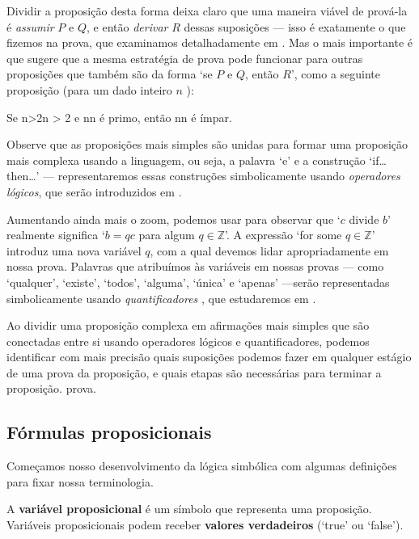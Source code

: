 Dividir a proposição desta forma deixa claro que uma maneira viável de prová-la é \textit{assumir} $P$ e $Q$, e então \textit{derivar} $R$ dessas suposições --- isso é exatamente o que fizemos na prova, que examinamos detalhadamente em . Mas o mais importante é que sugere que a mesma estratégia de prova pode funcionar para outras proposições que também são da forma `se $P$ e $Q$, então $R$', como a seguinte proposição (para um dado inteiro $n$ ):

\begin{center}
Se n>2n > 2 e nn é primo, então nn é ímpar.
\end{center}

Observe que as proposições mais simples são unidas para formar uma proposição mais complexa usando a linguagem, ou seja, a palavra `e' e a construção `if\dots{} then\dots{}' --- representaremos essas construções simbolicamente usando \textit {operadores lógicos}, que serão introduzidos em .

Aumentando ainda mais o zoom, podemos usar  para observar que `$c$ divide $b$' realmente significa `$b = qc$ para algum $q \in \mathbb{Z}$'. A expressão `for some $q \in \mathbb{Z}$' introduz uma nova variável $q$, com a qual devemos lidar apropriadamente em nossa prova. Palavras que atribuímos às variáveis ​​em nossas provas --- como `qualquer', `existe', `todos', `alguma', `única' e `apenas' ---serão representadas simbolicamente usando \textit{quantificadores} , que estudaremos em .

Ao dividir uma proposição complexa em afirmações mais simples que são conectadas entre si usando operadores lógicos e quantificadores, podemos identificar com mais precisão quais suposições podemos fazer em qualquer estágio de uma prova da proposição, e quais etapas são necessárias para terminar a proposição. prova.

\subsection*{Fórmulas proposicionais}

Começamos nosso desenvolvimento da lógica simbólica com algumas definições para fixar nossa terminologia.

\begin{definition}
\label{defPropositionalVariable}
A \textbf{variável proposicional} é um símbolo que representa uma proposição. Variáveis ​​proposicionais podem receber \textbf{valores verdadeiros} (`true' ou `false').
\end{definition}

